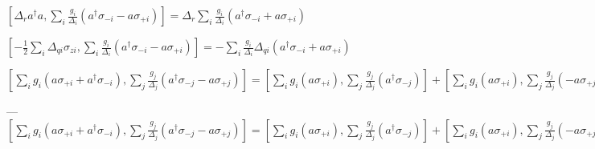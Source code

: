 $[\Delta_r a^\dagger a, \sum\limits_i \frac{g_i} {\Delta_i} (a^\dagger
\sigma_{-i} - a \sigma_{+i})] = \Delta_r \sum\limits_i \frac{g_i} {\Delta_i} (a^\dagger \sigma_{-i} + a \sigma_{+i})$

$[- \frac{1}{2} \sum\limits_i \Delta_{qi} \sigma_{zi}, \sum\limits_i \frac{g_i} {\Delta_i} (a^\dagger \sigma_{-i} - a \sigma_{+i})] = 
- \sum\limits_i \frac{g_i} {\Delta_i} \Delta_{qi} (a^\dagger \sigma_{-i} + a \sigma_{+i}) $

$[\sum\limits_i g_i (a \sigma_{+i} + a^\dagger \sigma_{-i}), \sum\limits_j \frac{g_j} {\Delta_j} (a^\dagger \sigma_{-j} - a \sigma_{+j})] = 
[\sum\limits_i g_i (a \sigma_{+i}), \sum\limits_j \frac{g_j} {\Delta_j} (a^\dagger \sigma_{-j})] +
[\sum\limits_i g_i (a \sigma_{+i}), \sum\limits_j \frac{g_j} {\Delta_j} (- a \sigma_{+j})] +
[\sum\limits_i g_i (a^\dagger \sigma_{-i}), \sum\limits_j \frac{g_j} {\Delta_j} (a^\dagger \sigma_{-j})] +
[\sum\limits_i g_i (a^\dagger \sigma_{-i}), \sum\limits_j \frac{g_j} {\Delta_j} (- a \sigma_{+j})] =
\sum\limits_{ij} g_i (a \sigma_{+i}) \frac{g_j} {\Delta_j} (a^\dagger \sigma_{-j}) -
\sum\limits_{ij} \frac{g_j} {\Delta_j} (a^\dagger \sigma_{-j}) g_i (a \sigma_{+i}) +
\sum\limits_{ij} g_i (a^\dagger \sigma_{-i}) \frac{g_j} {\Delta_j} (- a \sigma_{+j}) -
\sum\limits_{ij} \frac{g_j} {\Delta_j} (- a \sigma_{+j}) g_i (a^\dagger \sigma_{-i}) = 
\sum\limits_{ij} g_i \frac{g_j} {\Delta_j} a a^\dagger \sigma_{+i} \sigma_{-j} -
\sum\limits_{ij} g_i \frac{g_j} {\Delta_j} a^\dagger a \sigma_{-j} \sigma_{+i} -
\sum\limits_{ij} g_i \frac{g_j} {\Delta_j} a^\dagger a \sigma_{-i} \sigma_{+j} +
\sum\limits_{ij} g_i \frac{g_j} {\Delta_j} a a^\dagger \sigma_{+j} \sigma_{-i} = 
2 \sum\limits_{i \neq j} g_i \frac{g_j} {\Delta_j} \sigma_{+i} \sigma_{-j} +
\sum\limits_{i} g_i \frac{g_i} {\Delta_i} \sigma_{+i} \sigma_{-i} +
\sum\limits_{i} g_i \frac{g_i} {\Delta_i} \sigma_{+i} \sigma_{-i} -
2 \sum\limits_{i} g_i \frac{g_i} {\Delta_i} a^\dagger a \sigma_{zi} = $

---
$[\sum\limits_i g_i (a \sigma_{+i} + a^\dagger \sigma_{-i}), \sum\limits_j \frac{g_j} {\Delta_j} (a^\dagger \sigma_{-j} - a \sigma_{+j})] = 
[\sum\limits_i g_i (a \sigma_{+i}), \sum\limits_j \frac{g_j} {\Delta_j} (a^\dagger \sigma_{-j})] +
[\sum\limits_i g_i (a \sigma_{+i}), \sum\limits_j \frac{g_j} {\Delta_j} (- a \sigma_{+j})] +
[\sum\limits_i g_i (a^\dagger \sigma_{-i}), \sum\limits_j \frac{g_j} {\Delta_j} (a^\dagger \sigma_{-j})] +
[\sum\limits_i g_i (a^\dagger \sigma_{-i}), \sum\limits_j \frac{g_j} {\Delta_j} (- a \sigma_{+j})] $

